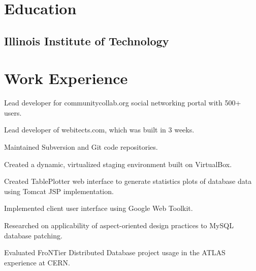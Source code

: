 \documentclass{resume}
\begin{document}
\author{Dmitry Ratnikov}
\maketitle

\section{Education}

\subsection{Illinois Institute of Technology}


\section{Work Experience}

\begin{compactitem}
  \item Lead developer for communitycollab.org social networking portal with 500+ users.
  \item Lead developer of webitects.com, which was built in 3 weeks.
  \item Maintained Subversion and Git code repositories.
  \item Created a dynamic, virtualized staging environment built on VirtualBox.
\end{compactitem}

\begin{compactitem}
  \item Created TablePlotter web interface to generate statistics plots of database data using Tomcat JSP implementation.
  \item Implemented client user interface using Google Web Toolkit.
\end{compactitem}

\begin{compactitem}
  \item Researched on applicability of aspect-oriented design practices to MySQL database patching.
  \item Evaluated FroNTier Distributed Database project usage in the ATLAS experience at CERN.
\end{compactitem}
\end{document}
